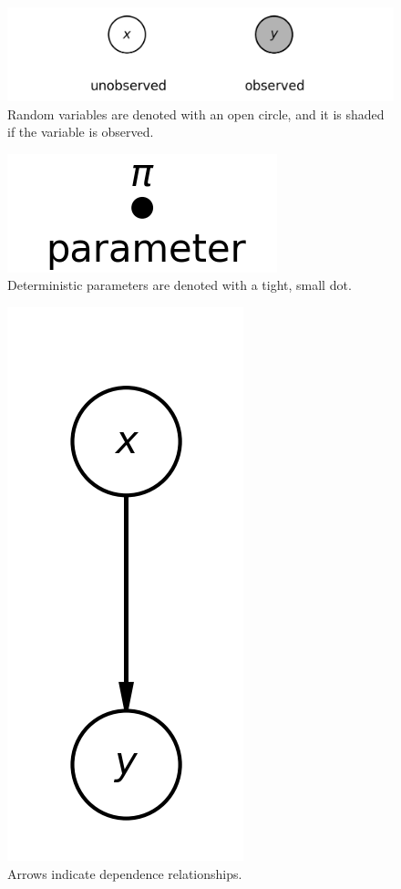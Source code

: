 \begin{figure}
    \centering
    \includegraphics[width=0.5\paperwidth]{../GraphicalModels/fig/RandomVar.png}
    \caption{Random variables are denoted with an open circle, and it is shaded if the variable is observed.}
    \label{fig:random-var}
\end{figure}
\begin{figure}
    \centering
    \includegraphics[width=0.15\paperwidth]{../GraphicalModels/fig/DeterministicParam.png}
    \caption{Deterministic parameters are denoted with a tight, small dot.}
    \label{fig:deterministic-param}
\end{figure}
\begin{figure}
    \centering
    \includegraphics[width=0.1\paperwidth]{../GraphicalModels/fig/arrows.png}
    \caption{Arrows indicate dependence relationships.}
    \label{fig:arrows}
\end{figure}
